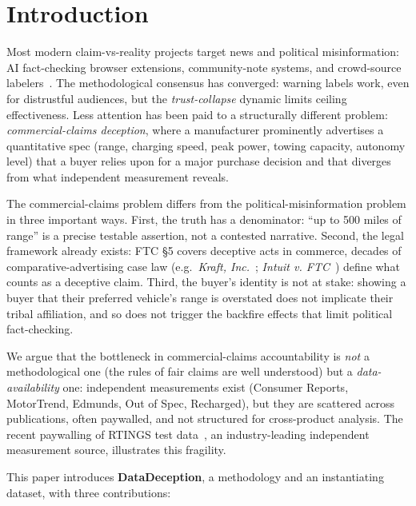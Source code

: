 \documentclass{article}
\begin{document}
\section{Introduction}\label{sec:intro}

Most modern claim-vs-reality projects target news and political misinformation: AI fact-checking browser extensions, community-note systems, and crowd-source labelers~\cite{nhb_warning_labels_2024}. The methodological consensus has converged: warning labels work, even for distrustful audiences, but the \emph{trust-collapse} dynamic limits ceiling effectiveness. Less attention has been paid to a structurally different problem: \emph{commercial-claims deception}, where a manufacturer prominently advertises a quantitative spec (range, charging speed, peak power, towing capacity, autonomy level) that a buyer relies upon for a major purchase decision and that diverges from what independent measurement reveals.

The commercial-claims problem differs from the political-misinformation problem in three important ways. First, the truth has a denominator: ``up to 500 miles of range'' is a precise testable assertion, not a contested narrative. Second, the legal framework already exists: FTC \S 5 covers deceptive acts in commerce, decades of comparative-advertising case law (e.g.\ \emph{Kraft, Inc.}~\cite{ftc_kraft_1991}; \emph{Intuit v. FTC}~\cite{ftc_intuit_2026}) define what counts as a deceptive claim. Third, the buyer's identity is not at stake: showing a buyer that their preferred vehicle's range is overstated does not implicate their tribal affiliation, and so does not trigger the backfire effects that limit political fact-checking.

We argue that the bottleneck in commercial-claims accountability is \emph{not} a methodological one (the rules of fair claims are well understood) but a \emph{data-availability} one: independent measurements exist (Consumer Reports, MotorTrend, Edmunds, Out of Spec, Recharged), but they are scattered across publications, often paywalled, and not structured for cross-product analysis. The recent paywalling of RTINGS test data~\cite{rtings_paywall_2026}, an industry-leading independent measurement source, illustrates this fragility.

This paper introduces \textbf{DataDeception}, a methodology and an instantiating dataset, with three contributions:
\end{document}
